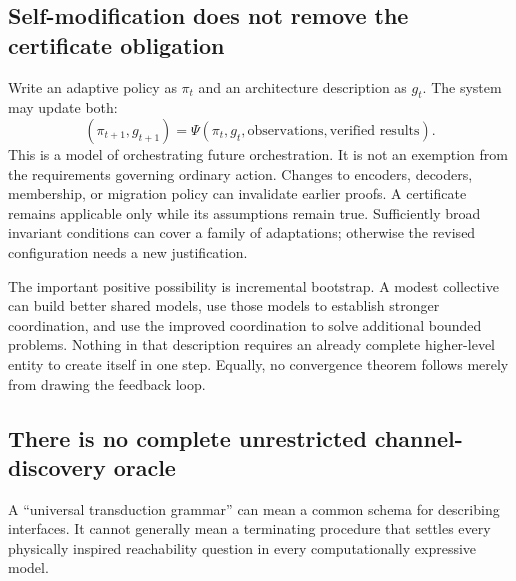 \documentclass[11pt,a4paper]{article}
\theoremstyle{definition}
\theoremstyle{remark}
\begin{document}
\subsection{Self-modification does not remove the certificate obligation}
Write an adaptive policy as $\pi_t$ and an architecture description as $g_t$. The system may update both:
\[
 (\pi_{t+1},g_{t+1})=\Psi(\pi_t,g_t,\text{observations},\text{verified results}).
\]
This is a model of orchestrating future orchestration. It is not an exemption from the requirements governing ordinary action. Changes to encoders, decoders, membership, or migration policy can invalidate earlier proofs. A certificate remains applicable only while its assumptions remain true. Sufficiently broad invariant conditions can cover a family of adaptations; otherwise the revised configuration needs a new justification.

The important positive possibility is incremental bootstrap. A modest collective can build better shared models, use those models to establish stronger coordination, and use the improved coordination to solve additional bounded problems. Nothing in that description requires an already complete higher-level entity to create itself in one step. Equally, no convergence theorem follows merely from drawing the feedback loop.

\subsection{There is no complete unrestricted channel-discovery oracle}
A ``universal transduction grammar'' can mean a common schema for describing interfaces. It cannot generally mean a terminating procedure that settles every physically inspired reachability question in every computationally expressive model.
\end{document}
